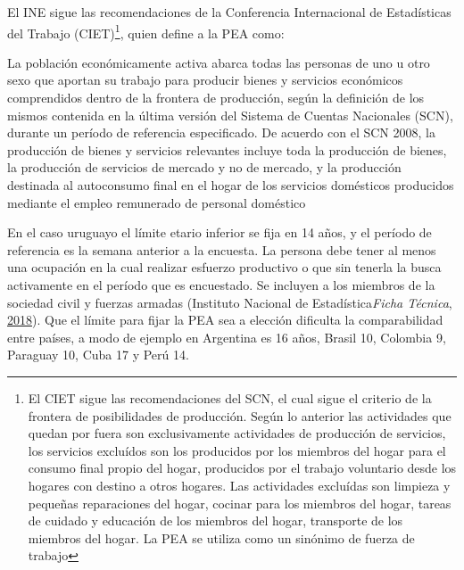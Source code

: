 \documentclass[12pt,twoside]{reedthesis}
\begin{document}
El INE sigue las recomendaciones de la Conferencia Internacional de Estadísticas del Trabajo (CIET)\footnote{El CIET sigue las recomendaciones del SCN, el cual sigue el criterio de la frontera de posibilidades de producción. Según lo anterior las actividades que quedan por fuera son exclusivamente actividades de producción de servicios, los servicios excluídos son los producidos por los miembros del hogar para el consumo final propio del hogar, producidos por el trabajo voluntario desde los hogares con destino a otros hogares. Las actividades excluídas son limpieza y pequeñas reparaciones del hogar, cocinar para los miembros del hogar, tareas de cuidado y educación de los miembros del hogar, transporte de los miembros del hogar. La PEA se utiliza como un sinónimo de fuerza de trabajo}, quien define a la PEA como:
\begin{center}
\begin{minipage}{0.95\linewidth}
    \vspace{1pt}%
    {\small
    La población económicamente activa abarca todas las personas de
    uno u otro sexo que aportan su trabajo para producir bienes y servicios
    económicos comprendidos dentro de la frontera de producción, según
    la definición de los mismos contenida en la última versión del Sistema
    de Cuentas Nacionales (SCN), durante un período de referencia
    especificado. De acuerdo con el SCN 2008, la producción de bienes y
    servicios relevantes incluye toda la producción de bienes, la producción
    de servicios de mercado y no de mercado, y la producción destinada al
    autoconsumo final en el hogar de los servicios domésticos producidos
    mediante el empleo remunerado de personal doméstico
    }
    \vspace{1pt}%
\end{minipage}
\end{center}
En el caso uruguayo el límite etario inferior se fija en 14 años, y el período de referencia es la semana anterior a la encuesta. La persona debe tener al menos una ocupación en la cual realizar esfuerzo productivo o que sin tenerla la busca activamente en el período que es encuestado. Se incluyen a los miembros de la sociedad civil y fuerzas armadas (Instituto Nacional de Estadística\emph{Ficha Técnica}, \protect\hyperlink{ref-INE2018}{2018}). Que el límite para fijar la PEA sea a elección dificulta la comparabilidad entre países, a modo de ejemplo en Argentina es 16 años, Brasil 10, Colombia 9, Paraguay 10, Cuba 17 y Perú 14.
\end{document}
